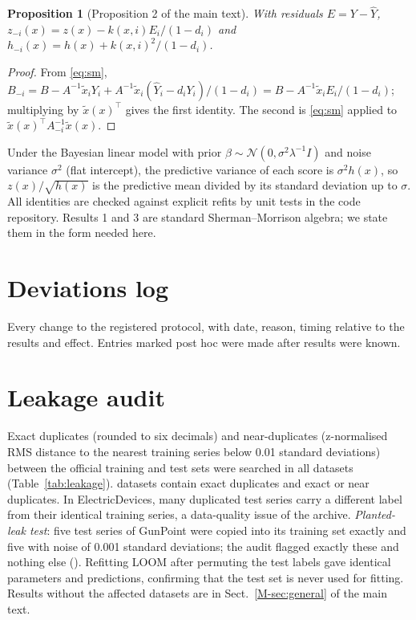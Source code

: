 \documentclass[11pt]{article}
\newtheorem{proposition}{Proposition}
\begin{document}
\begin{proposition}[Proposition 2 of the main text]
With residuals $E=Y-\hat Y$, $z_{-i}(x)=z(x)-k(x,i)E_i/(1-d_i)$ and $h_{-i}(x)=h(x)+k(x,i)^2/(1-d_i)$.
\end{proposition}
\begin{proof}
From \eqref{eq:sm}, $B_{-i}=B-A^{-1}\tilde x_iY_i+A^{-1}\tilde x_i(\hat Y_i-d_iY_i)/(1-d_i)=B-A^{-1}\tilde x_iE_i/(1-d_i)$; multiplying by $\tilde x(x)^\top$ gives the first identity. The second is \eqref{eq:sm} applied to $\tilde x(x)^\top A_{-i}^{-1}\tilde x(x)$.
\end{proof}
Under the Bayesian linear model with prior $\beta\sim\mathcal N(0,\sigma^2\lambda^{-1}I)$ and noise variance $\sigma^2$ (flat intercept), the predictive variance of each score is $\sigma^2h(x)$, so $z(x)/\sqrt{h(x)}$ is the predictive mean divided by its standard deviation up to $\sigma$. All identities are checked against explicit refits by unit tests in the code repository. Results 1 and 3 are standard Sherman--Morrison algebra; we state them in the form needed here.

\section{Deviations log}\label{sec:deviations}
Every change to the registered protocol, with date, reason, timing relative to the results and effect. Entries marked post hoc were made after results were known.
{\footnotesize}

\section{Leakage audit}\label{sec:leakage}
Exact duplicates (rounded to six decimals) and near-duplicates (z-normalised RMS distance to the nearest training series below 0.01 standard deviations) between the official training and test sets were searched in all \NDatasets{} datasets (Table~\ref{tab:leakage}). \NDupExact{} datasets contain exact duplicates and \NDupNear{} exact or near duplicates. In ElectricDevices, many duplicated test series carry a different label from their identical training series, a data-quality issue of the archive. \emph{Planted-leak test}: five test series of GunPoint were copied into its training set exactly and five with noise of 0.001 standard deviations; the audit flagged exactly these and nothing else (\PlantedPass). Refitting LOOM after permuting the test labels gave identical parameters and predictions, confirming that the test set is never used for fitting. Results without the affected datasets are in Sect.~\ref{M-sec:general} of the main text.
\end{document}
